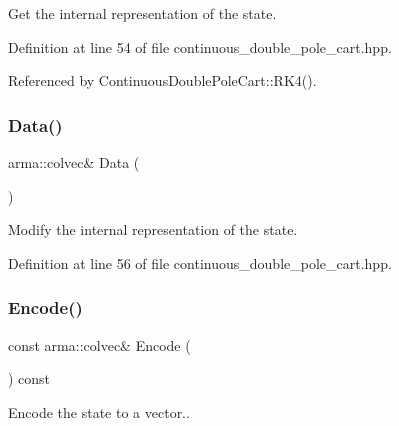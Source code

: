 Get the internal representation of the state. 



Definition at line 54 of file continuous\+\_\+double\+\_\+pole\+\_\+cart.\+hpp.



Referenced by Continuous\+Double\+Pole\+Cart\+::\+R\+K4().

\mbox{\label{classmlpack_1_1rl_1_1ContinuousDoublePoleCart_1_1State_ad6a50c7b5fced2e931d9a4b4ff989ed6}} 
\subsubsection{Data()\hspace{0.1cm}{\footnotesize\ttfamily [2/2]}}
{\footnotesize\ttfamily arma\+::colvec\& Data (\begin{DoxyParamCaption}{ }\end{DoxyParamCaption})\hspace{0.3cm}{\ttfamily [inline]}}



Modify the internal representation of the state. 



Definition at line 56 of file continuous\+\_\+double\+\_\+pole\+\_\+cart.\+hpp.

\mbox{\label{classmlpack_1_1rl_1_1ContinuousDoublePoleCart_1_1State_a8c1a320788b55fad936455caf0acb62a}} 
\subsubsection{Encode()}
{\footnotesize\ttfamily const arma\+::colvec\& Encode (\begin{DoxyParamCaption}{ }\end{DoxyParamCaption}) const\hspace{0.3cm}{\ttfamily [inline]}}



Encode the state to a vector.. 




